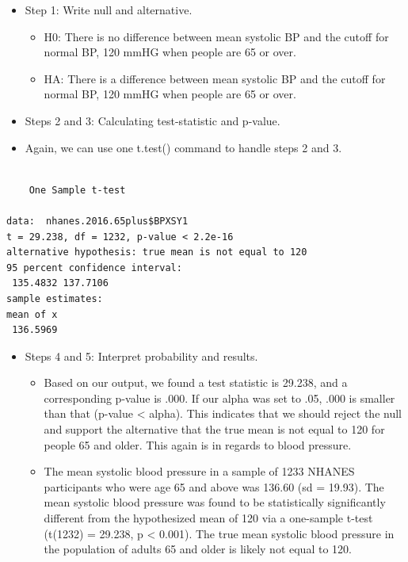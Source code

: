 \documentclass[
  letterpaper,
  DIV=11,
  numbers=noendperiod]{scrreprt}
\newenvironment{Shaded}{\begin{snugshade}}{\end{snugshade}}
\newcommand{\AttributeTok}[1]{\textcolor[rgb]{0.40,0.45,0.13}{#1}}
\newcommand{\DecValTok}[1]{\textcolor[rgb]{0.68,0.00,0.00}{#1}}
\newcommand{\FloatTok}[1]{\textcolor[rgb]{0.68,0.00,0.00}{#1}}
\newcommand{\FunctionTok}[1]{\textcolor[rgb]{0.28,0.35,0.67}{#1}}
\newcommand{\NormalTok}[1]{\textcolor[rgb]{0.00,0.23,0.31}{#1}}
\newcommand{\SpecialCharTok}[1]{\textcolor[rgb]{0.37,0.37,0.37}{#1}}
\providecommand{\tightlist}{%
  \setlength{\itemsep}{0pt}\setlength{\parskip}{0pt}}\usepackage{longtable,booktabs,array}
\begin{document}
\begin{itemize}
\tightlist
\item
  Step 1: Write null and alternative.

  \begin{itemize}
  \tightlist
  \item
    H0: There is no difference between mean systolic BP and the cutoff
    for normal BP, 120 mmHG when people are 65 or over.
  \item
    HA: There is a difference between mean systolic BP and the cutoff
    for normal BP, 120 mmHG when people are 65 or over.
  \end{itemize}
\item
  Steps 2 and 3: Calculating test-statistic and p-value.
\item
  Again, we can use one t.test() command to handle steps 2 and 3.
\end{itemize}

\begin{Shaded}
\end{Shaded}

\begin{verbatim}

    One Sample t-test

data:  nhanes.2016.65plus$BPXSY1
t = 29.238, df = 1232, p-value < 2.2e-16
alternative hypothesis: true mean is not equal to 120
95 percent confidence interval:
 135.4832 137.7106
sample estimates:
mean of x 
 136.5969 
\end{verbatim}

\begin{itemize}
\tightlist
\item
  Steps 4 and 5: Interpret probability and results.

  \begin{itemize}
  \tightlist
  \item
    Based on our output, we found a test statistic is 29.238, and a
    corresponding p-value is .000. If our alpha was set to .05, .000 is
    smaller than that (p-value \textless{} alpha). This indicates that
    we should reject the null and support the alternative that the true
    mean is not equal to 120 for people 65 and older. This again is in
    regards to blood pressure.
  \item
    The mean systolic blood pressure in a sample of 1233 NHANES
    participants who were age 65 and above was 136.60 (sd = 19.93). The
    mean systolic blood pressure was found to be statistically
    significantly different from the hypothesized mean of 120 via a
    one-sample t-test (t(1232) = 29.238, p \textless{} 0.001). The true
    mean systolic blood pressure in the population of adults 65 and
    older is likely not equal to 120.
  \end{itemize}
\end{itemize}
\end{document}
